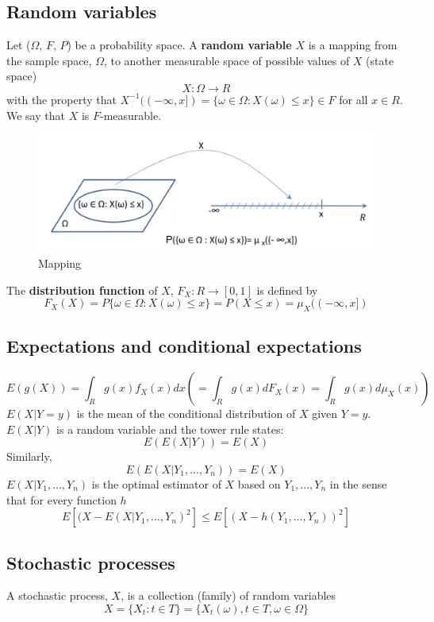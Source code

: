 \documentclass[11pt,a4paper]{book}
\theoremstyle{definition}\newtheorem{definition}{Definition}
\theoremstyle{definition}\newtheorem{fact}{Fact}
\theoremstyle{definition}\newtheorem{remark}{Remark}
\theoremstyle{definition}\newtheorem{ex}{Ex.}
\theoremstyle{definition}\newtheorem{project}{Project}
\theoremstyle{definition}\newtheorem{problem}{Problem}
\theoremstyle{definition}\newtheorem{example}{Example}
\numberwithin{theorem}{section}
\numberwithin{corollary}{chapter}
\numberwithin{assumption}{chapter}
\numberwithin{definition}{chapter}
\numberwithin{prop}{chapter}
\numberwithin{notation}{chapter}
\numberwithin{problem}{chapter}
\numberwithin{example}{chapter}
\numberwithin{fact}{chapter}
\numberwithin{ex}{chapter}
\begin{document}
\subsection{Random variables}
Let ($\Omega$, $F$, $P$) be a probability space. A \textbf{random variable} $X$ is a mapping from the sample space, $\Omega$, to another measurable space of possible values of $X$ (state space)
$$ X : \Omega \rightarrow R$$
with the property that $X^{-1}((-\infty, x]) = \{\omega \in \Omega : X(\omega) \leq x\} \in F$ for all $x \in R$. We say that $X$ is $F$-measurable.

\begin{figure}[H]
	\centering
	\includegraphics[scale=0.5]{Chapter 1/Chapter1_1.png}
	\caption{Mapping}
\end{figure}

The \textbf{distribution function} of $X$, $F_X : R \rightarrow [0,1]$ is defined by
$$ F_X(X) = P \{\omega \in \Omega : X(\omega) \leq x \} = P(X \leq x) = \mu_X((-\infty, x]) $$

\subsection{Expectations and conditional expectations}

$$E(g(X)) = \int_R g(x) f_X(x) dx  (= \int_R g(x) dF_X(x) = \int_R g(x) d\mu_X(x)) $$
$E(X | Y=y)$ is the mean of the conditional distribution of $X$ given $Y=y$.
$E(X | Y)$ is a random variable and the tower rule states:
$$E(E(X | Y)) = E(X)$$
Similarly,
$$E(E(X | Y_1,...,Y_n)) = E(X)$$
$E(X | Y_1,...,Y_n)$ is the optimal estimator of $X$ based on $Y_1,...,Y_n$ in the sense that for every function $h$
$$ E[ (X-E(X | Y_1,...,Y_n)^2 ] \leq E[ (X - h(Y_1,...,Y_n))^2 ] $$

\subsection{Stochastic processes}

A stochastic process, $X$, is a collection (family) of random variables
$$ X = \{X_t : t \in T \} = \{X_t(\omega), t \in T, \omega \in \Omega \} $$
\end{document}
